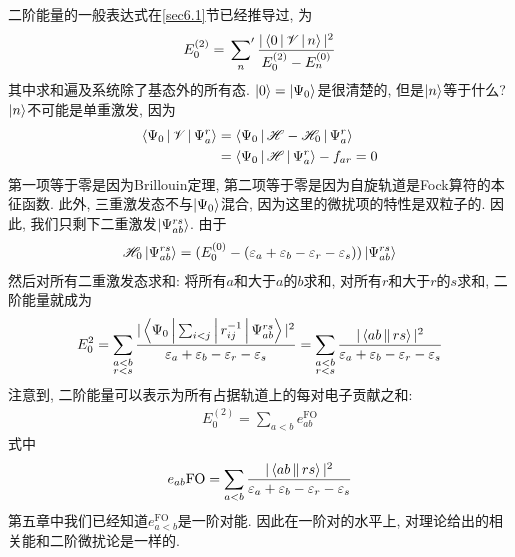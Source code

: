 二阶能量的一般表达式在\ref{sec6.1}节已经推导过, 为
\begin{align}
E_0^{(2)} = \sideset{}{'}\sum_n\frac{|\Braket{0|\mathscr{V}|n}|^2}{E_0^{(2)} - E_n^{(0)}}
\end{align}
其中求和遍及系统除了基态外的所有态. $\Ket{0} = \Ket{\Psi_0}$是很清楚的, 但是$\Ket{n}$等于什么? $\Ket{n}$不可能是单重激发, 因为
\begin{align*}
\Braket{\Psi_0|\mathscr{V}|\Psi_a^r} & = \Braket{\Psi_0|\mathscr{H}-\mathscr{H}_0|\Psi_a^r} \\
                             & = \Braket{\Psi_0|\mathscr{H}|\Psi_a^r} - f_{ar} = 0
\end{align*}
第一项等于零是因为Brillouin定理, 第二项等于零是因为自旋轨道是Fock算符的本征函数. 此外, 三重激发态不与$\Ket{\Psi_0}$混合, 因为这里的微扰项的特性是双粒子的. 因此, 我们只剩下二重激发$\Ket{\Psi_{ab}^{rs}}$. 由于
\begin{align*}
\mathscr{H}_0\Ket{\Psi_{ab}^{rs}} = (E_0^{(0)} - (\varepsilon_a + \varepsilon_b - \varepsilon_r - \varepsilon_s))\Ket{\Psi_{ab}^{rs}}
\end{align*}
然后对所有二重激发态求和: 将所有$a$和大于$a$的$b$求和, 对所有$r$和大于$r$的$s$求和, 二阶能量就成为
\begin{align}
E_0^{2} = \sum_{\substack{a<b\\r<s}} \frac{|\Braket{\Psi_0|\sum_{i<j}|r_{ij}^{-1}|\Psi_{ab}^{rs}}|^2}{\varepsilon_a + \varepsilon_b -\varepsilon_r-\varepsilon_s} = \sum_{\substack{a<b\\r<s}} \frac{|\Braket{ab||rs}|^2}{\varepsilon_a + \varepsilon_b -\varepsilon_r-\varepsilon_s}
\end{align}
注意到, 二阶能量可以表示为所有占据轨道上的每对电子贡献之和:
\begin{align*}
E_0^{(2)} = \sum_{a<b}e_{ab}^\mathrm{FO}
\end{align*}
式中
\begin{align*}
e_{ab}\mathrm{FO} =  \sum_{a<b} \frac{|\Braket{ab||rs}|^2}{\varepsilon_a + \varepsilon_b -\varepsilon_r-\varepsilon_s}
\end{align*}
第五章中我们已经知道$e_{a<b}^\mathrm{FO}$是一阶对能. 因此在一阶对的水平上, 对理论给出的相关能和二阶微扰论是一样的.

